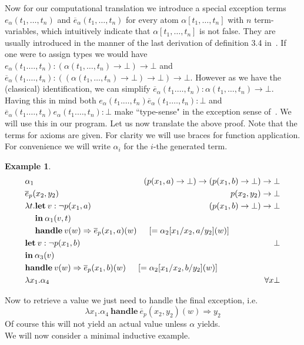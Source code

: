\documentclass[onehalfspacing]{article}
\newtheorem{example}[theorem]{Example}
\begin{document}
Now for our computational translation we introduce a special exception terms $e_\alpha(t_1,\dots,t_n)$ and $\overline e_\alpha(t_1,\dots,t_n)$ for every atom $\alpha[t_1,\dots,t_n]$ with $n$ term-variables, which intuitively indicate that $\alpha[t_1,\dots,t_n]$ is not false. They are usually introduced in the manner of the last derivation of definition 3.4 in~\cite{de_Groote_1995}. If one were to assign types we would have $e_\alpha(t_1.\dots,t_n) : (\alpha(t_1,\dots,t_n)\to\bot)\to\bot$ and $\overline e_\alpha(t_1.\dots,t_n) : ((\alpha(t_1,\dots,t_n)\to\bot)\to\bot)\to\bot$. However as we have the (classical) identification, we can simplify $\overline e_\alpha(t_1.\dots,t_n) : \alpha(t_1,\dots,t_n)\to\bot$. Having this in mind both $e_\alpha(t_1.\dots,t_n) \overline e_\alpha(t_1.\dots,t_n) : \bot$ and $\overline e_\alpha(t_1.\dots,t_n) e_\alpha(t_1.\dots,t_n) : \bot$ make ``type-sense" in the exception sense of~\cite{de_Groote_1995}. We will use this in our program. Let us now translate the above proof. Note that the terms for axioms are given. For clarity we will use braces for function application. For convenience we will write $\alpha_i$ for the $i$-the generated term.
\setcounter{equation}{0}
\begin{example}\hfill
	\begin{align}
		& \alpha_1 & (p(x_1,a)\to\bot)\to(p(x_1, b)\to\bot)\to\bot\\
		& \overline e_p(x_2, y_2) & p(x_2, y_2)\to\bot\\
		& \lambda t. \mathbf{let}\:v : \neg p(x_1, a)&(p(x_1, b)\to\bot)\to\bot\\
		& \phantom{\lambda t.}\mathbf{in}\:\alpha_1(v, t) &\\
		& \phantom{\lambda t.}\mathbf{handle}\:v(w)\Rightarrow \overline e_p(x_1, a)(w)\indent [= \alpha_2[x_1/x_2, a/y_2](w)]\hspace*{-4cm}\nonumber&\\
		& \mathbf{let}\:v : \neg p(x_1, b)\:&\bot\\
		& \mathbf{in}\:\alpha_3(v) &\nonumber\\
		& \mathbf{handle}\:v(w)\Rightarrow \overline e_p(x_1, b)(w)\indent[= \alpha_2[x_1/x_2, b/y_2](w)]\hspace*{-4cm}\nonumber&\\
		& \lambda x_1.\alpha_4 &\forall x\bot
	\end{align}
\end{example}

Now to retrieve a value we just need to handle the final exception, i.e.
$$\lambda x_1.\alpha_4\:\mathbf{handle}\: \overline{e}_p(x_2, y_2)(w)\Rightarrow y_2$$
Of course this will not yield an actual value unless $\alpha$ yields.\\
We will now consider a minimal inductive example.\pagebreak
\end{document}
